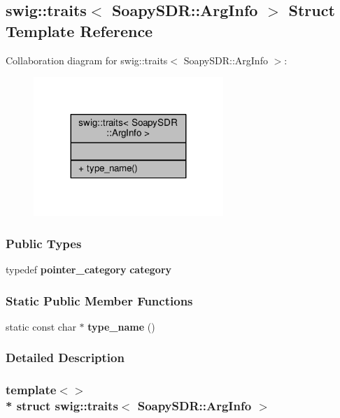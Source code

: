 \subsection{swig\+:\+:traits$<$ Soapy\+S\+DR\+:\+:Arg\+Info $>$ Struct Template Reference}
\label{structswig_1_1traits_3_01SoapySDR_1_1ArgInfo_01_4}


Collaboration diagram for swig\+:\+:traits$<$ Soapy\+S\+DR\+:\+:Arg\+Info $>$\+:
\nopagebreak
\begin{figure}[H]
\begin{center}
\leavevmode
\includegraphics[width=203pt]{de/dc8/structswig_1_1traits_3_01SoapySDR_1_1ArgInfo_01_4__coll__graph}
\end{center}
\end{figure}
\subsubsection*{Public Types}
\begin{DoxyCompactItemize}
\item 
typedef {\bf pointer\+\_\+category} {\bf category}
\end{DoxyCompactItemize}
\subsubsection*{Static Public Member Functions}
\begin{DoxyCompactItemize}
\item 
static const char $\ast$ {\bf type\+\_\+name} ()
\end{DoxyCompactItemize}


\subsubsection{Detailed Description}
\subsubsection*{template$<$$>$\\*
struct swig\+::traits$<$ Soapy\+S\+D\+R\+::\+Arg\+Info $>$}



